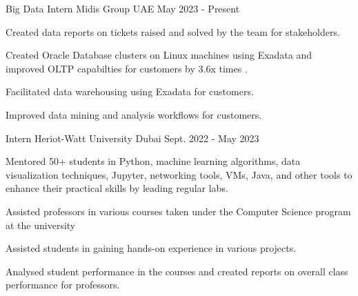 

\begin{cventries}
	
	\cventry
	{Big Data Intern} %
	{Midis Group} %
	{UAE} %
	{May 2023 - Present} %
	{
		\begin{cvitems} %
			\item Created data reports on tickets raised and solved by the team for stakeholders.
			\item Created Oracle Database clusters on Linux machines using Exadata and improved OLTP capabilties for customers by 3.6x times .
			\item Facilitated data warehousing using Exadata for customers.
			\item Improved data mining and analysis  workflows for customers.
		\end{cvitems}
	}
	
	\cventry
	{Intern} %
	{Heriot-Watt University} %
	{Dubai} %
	{Sept. 2022 - May 2023} %
	{
		\begin{cvitems} %
			\item Mentored 50+ students in Python, machine learning algorithms,  data visualization techniques, Jupyter, networking tools, VMs, Java, and other tools to enhance their practical skills by leading regular labs.
			\item Assisted professors in various courses taken under the Computer Science program at the university
			\item  Assisted students in gaining hands-on experience in various projects.
			\item  Analysed student performance in the courses and created reports on overall class performance for professors.
		\end{cvitems}
	}
	
\end{cventries}

